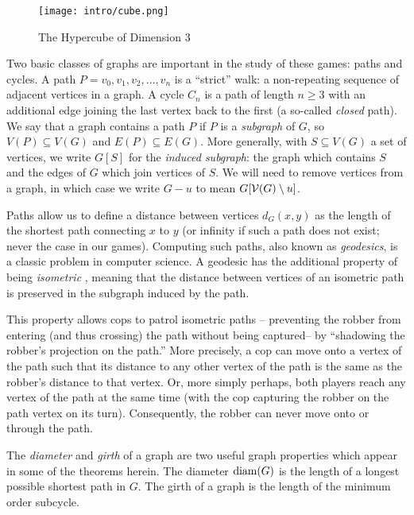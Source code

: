 \begin{figure}
\centering
\texttt{[image: intro/cube.png]}
\caption{The Hypercube of Dimension 3 \label{fig:hyper-cube}}
\end{figure}

Two basic classes of graphs are important in the study of these games: paths and cycles.
A path $P = v_0, v_1, v_2, \dots , v_n$ is a ``strict'' walk: a non-repeating sequence of
adjacent vertices in a graph. A cycle $C_n$ is a path of length $n \geq 3$ with an additional edge joining the last vertex back to the first (a so-called \textit{closed} path).
We say that a graph contains a path $P$ if $P$ is a \textit{subgraph} of $G$, so $V(P) \subseteq V(G)$ and $E(P) \subseteq E(G)$. More generally, with $S \subseteq V(G)$ a set of vertices, we write $G[S]$ for the \textit{induced subgraph}: the graph which contains $S$ and the edges of $G$ which join vertices of $S$. We will need to remove vertices from a graph, in which case we write $G - u$ to mean $G[\mathcal{V}(G) \setminus u]$.

Paths allow us to define a distance between vertices $d_G(x,y)$ as the length of the shortest path connecting $x$ to $y$ (or infinity if such a path does not exist; never the case in our games). Computing such paths, also known as \textit{geodesics}, is a classic problem in computer science.
A geodesic has the additional property of being \textit{isometric} \cite{pan2006isometric}, meaning that the distance between vertices of an isometric path is preserved in the subgraph induced by the path.

This property allows cops to patrol isometric paths \cite{aigner1984game} -- preventing
the robber from entering (and thus crossing) the path without being captured-- by ``shadowing the robber's projection on the path.'' More precisely, a cop can move onto a vertex of the path such that its distance to any other vertex of the path is the same as the robber's distance to that vertex. Or, more simply perhaps, both players reach any vertex of the path at the same time (with the cop capturing the robber on the path vertex on its turn). Consequently, the robber can never move onto or through the path.

The \textit{diameter} and \textit{girth} of a graph are two useful graph properties which appear in some of the theorems herein. The diameter $\operatorname{diam}(G)$ is the length of a longest possible shortest path in $G$. The girth of a graph is the length of the minimum order subcycle.

